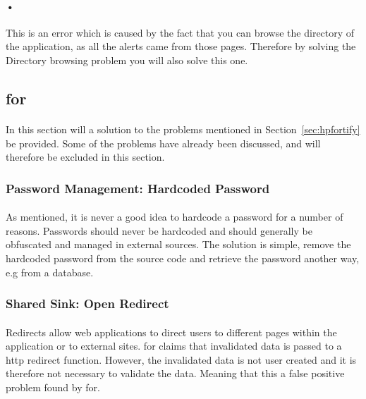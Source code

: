 \documentclass[11pt,english,a4paper]{report}
\begin{document}
\paragraph{•}
This is an error which is caused by the fact that you can browse the directory of the application, as all the alerts came from those pages.
Therefore by solving the Directory browsing problem you will also solve this one.

\subsection{\gls{for}}
\paragraph{}
In this section will a solution to the problems mentioned in Section~\ref{sec:hpfortify} be provided.
Some of the problems have already been discussed, and will therefore be excluded in this section. 

\subsubsection{Password Management: Hardcoded Password}
\label{passwordmanagement}
\paragraph{}
As mentioned, it is never a good idea to hardcode a password for a number of reasons.
Passwords should never be hardcoded and should generally be obfuscated and managed in external sources. 
The solution is simple, remove the hardcoded password from the source code and retrieve the password another way, e.g from a database.

\subsubsection{Shared Sink: Open Redirect}
\paragraph{}
Redirects allow web applications to direct users to different pages within the application or to external sites. 
\gls{for} claims that invalidated data is passed to a \gls{http} redirect function.
However, the invalidated data is not user created and it is therefore not necessary to validate the data.
Meaning that this a false positive problem found by \gls{for}. 
\end{document}
